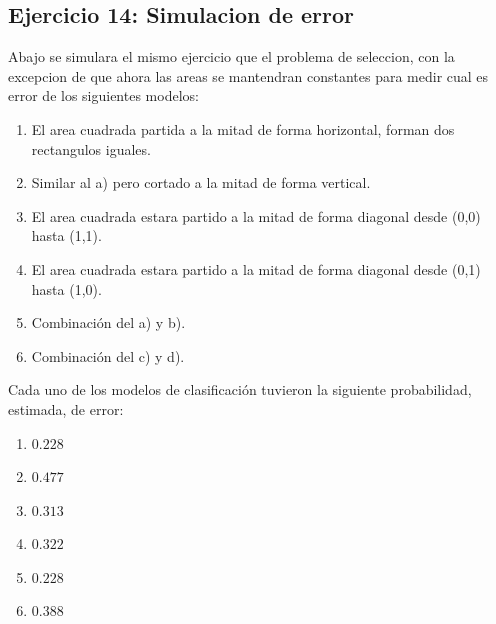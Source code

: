 \documentclass[12pt, a4paper]{article}
\begin{document}
\subsection{Ejercicio 14: Simulacion de error}
Abajo se simulara el mismo ejercicio que el problema de seleccion, con la excepcion de que ahora las areas se mantendran constantes para medir cual es error de los siguientes modelos:
\begin{enumerate}[label=(\alph*)]
	\item El area cuadrada partida a la mitad de forma horizontal, forman dos rectangulos iguales.
	\item Similar al a) pero cortado a la mitad de forma vertical.
	\item El area cuadrada estara partido a la mitad de forma diagonal desde (0,0) hasta (1,1).
	\item El area cuadrada estara partido a la mitad de forma diagonal desde (0,1) hasta (1,0).
	\item Combinación del a) y b).
	\item Combinación del c) y d).
\end{enumerate}
Cada uno de los modelos de clasificación tuvieron la siguiente probabilidad, estimada, de error:
\begin{enumerate}[label=(\alph*)]
	\item $0.228$
	\item $0.477$
	\item $0.313$
	\item $0.322$
	\item $0.228$
	\item $0.388$
\end{enumerate}
\end{document}
